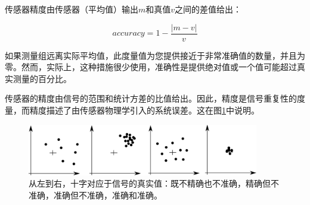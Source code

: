 
传感器精度由传感器（平均值）输出$ m $和真值$ v $之间的差值给出：

\begin{equation}
accuracy=1-\frac{|m-v|}{v}
\end{equation}




如果测量组远离实际平均值，此度量值为您提供接近于非常准确值的数量，并且为零。然而，实际上，这种措施很少使用，准确性是提供绝对值或一个值可能超过真实测量的百分比。

传感器的精度由信号的范围和统计方差的比值给出。因此，精度是信号重复性的度量，而精度描述了由传感器物理学引入的系统误差。这在图\ref{fig:precision}中说明。


\begin{figure}
	\centering
		\includegraphics[width=0.9\textwidth]{figs/precisionvsaccuracy.png}
	\caption{从左到右，十字对应于信号的真实值：既不精确也不准确，精确但不准确，准确但不准确，准确和准确。
	\label{fig:precision}}
\end{figure}


